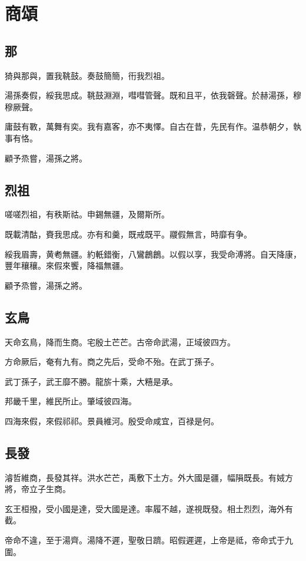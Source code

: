 \section[商頌]{商頌}

\subsection[那]{那}

猗與那與，置我鞉鼓。奏鼓簡簡，衎我烈祖。

湯孫奏假，綏我思成。鞉鼓淵淵，嘒嘒管聲。既和且平，依我磬聲。於赫湯孫，穆穆厥聲。

庸鼓有斁，萬舞有奕。我有嘉客，亦不夷懌。自古在昔，先民有作。温恭朝夕，執事有恪。

顧予烝嘗，湯孫之將。

\subsection[烈祖]{烈祖}

嗟嗟烈祖，有秩斯祜。申錫無疆，及爾斯所。

既載清酤，賚我思成。亦有和羹，既戒既平。鬷假無言，時靡有争。

綏我眉壽，黄耇無疆。約軝錯衡，八鸞鶬鶬。以假以享，我受命溥將。自天降康，豐年穰穰。來假來饗，降福無疆。

顧予烝嘗，湯孫之將。

\subsection[玄鳥]{玄鳥}

天命玄鳥，降而生商。宅殷土芒芒。古帝命武湯，正域彼四方。

方命厥后，奄有九有。商之先后，受命不殆。在武丁孫子。

武丁孫子，武王靡不勝。龍旂十乘，大糦是承。

邦畿千里，維民所止。肇域彼四海。

四海來假，來假祁祁。景員維河。殷受命咸宜，百禄是何。

\subsection[長發]{長發}

濬哲維商，長發其祥。洪水芒芒，禹敷下土方。外大國是疆，幅隕既長。有娀方將，帝立子生商。

玄王桓撥，受小國是達，受大國是達。率履不越，遂視既發。相土烈烈，海外有截。

帝命不違，至于湯齊。湯降不遲，聖敬日躋。昭假遲遲，上帝是祗，帝命式于九圍。

